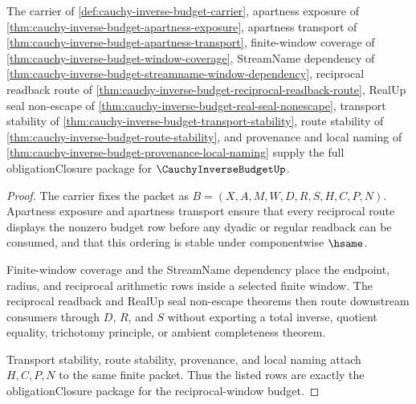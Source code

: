 \begin{theorem}
\label{thm:cauchy-inverse-budget-obligation-closure-package}
The carrier of \autoref{def:cauchy-inverse-budget-carrier}, apartness exposure of \autoref{thm:cauchy-inverse-budget-apartness-exposure}, apartness transport of \autoref{thm:cauchy-inverse-budget-apartness-transport}, finite-window coverage of \autoref{thm:cauchy-inverse-budget-window-coverage}, StreamName dependency of \autoref{thm:cauchy-inverse-budget-streamname-window-dependency}, reciprocal readback route of \autoref{thm:cauchy-inverse-budget-reciprocal-readback-route}, RealUp seal non-escape of \autoref{thm:cauchy-inverse-budget-real-seal-nonescape}, transport stability of \autoref{thm:cauchy-inverse-budget-transport-stability}, route stability of \autoref{thm:cauchy-inverse-budget-route-stability}, and provenance and local naming of \autoref{thm:cauchy-inverse-budget-provenance-local-naming} supply the full obligationClosure package for $\CauchyInverseBudgetUp$.
\end{theorem}
\begin{proof}
The carrier fixes the packet as $B=(X,A,M,W,D,R,S,H,C,P,N)$. Apartness exposure and apartness transport ensure that every reciprocal route displays the nonzero budget row before any dyadic or regular readback can be consumed, and that this ordering is stable under componentwise $\hsame$.

Finite-window coverage and the StreamName dependency place the endpoint, radius, and reciprocal arithmetic rows inside a selected finite window. The reciprocal readback and RealUp seal non-escape theorems then route downstream consumers through $D$, $R$, and $S$ without exporting a total inverse, quotient equality, trichotomy principle, or ambient completeness theorem.

Transport stability, route stability, provenance, and local naming attach $H,C,P,N$ to the same finite packet. Thus the listed rows are exactly the obligationClosure package for the reciprocal-window budget.
\end{proof}

